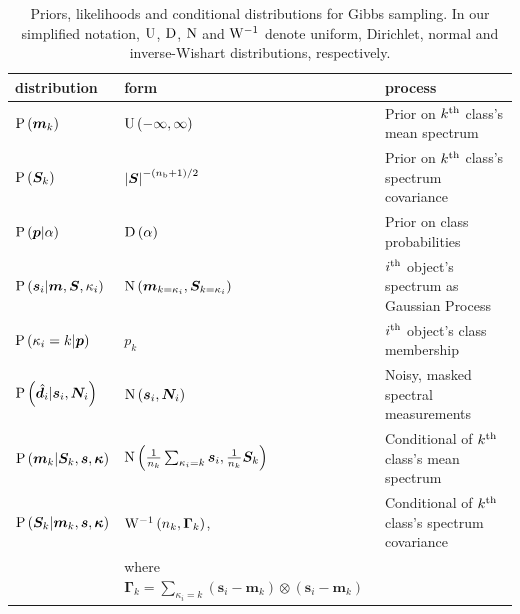 \documentclass[a4paper,fleqn,usenatbib]{mnras}
\newcommand{\nb}{n_{\rm b}}
\newcommand{\prob}{{\rm P}}
\newcommand{\normal}{{\rm{N}}}
\newcommand{\uniform}{{\rm U}}
\newcommand{\dirichlet}{{\rm D}}
\newcommand{\invwish}{{\rm W}^{-1}}
\newcommand{\specmean}{{\bm m}}
\newcommand{\speccov}{{\bm S}}
\newcommand{\classprob}{{p}}
\newcommand{\classprobs}{{\bm p}}
\newcommand{\objspec}{{\bm s}}
\newcommand{\objclass}{{\kappa}}
\newcommand{\objclasses}{{\bm \kappa}}
\newcommand{\objdata}{\hat{\bm d}}
\newcommand{\objnoise}{{\bm N}}
\newcommand{\scalemat}{{\bm \Gamma}}
\begin{document}
\begin{table}
    \centering
    \caption{Priors, likelihoods and conditional distributions for Gibbs sampling. In our simplified notation, $\uniform$, $\dirichlet$, $\normal$ and $\invwish$ denote uniform, Dirichlet, normal and inverse-Wishart distributions, respectively.}
    \label{tab:prob_dists}
    \begin{tabular}{lll}
        \hline
        distribution & form & process \\
        \hline
        $\prob\left(\specmean_k\right)$ & $\uniform\left(-\infty,\infty\right)$ & Prior on $k^{\rm th}$ class's mean spectrum \\
        $\prob\left(\speccov_k\right)$ & $\left| \speccov \right|^{-\left(\nb+1\right)/2}$ & Prior on $k^{\rm th}$ class's spectrum covariance \\
        $\prob\left(\classprobs|\alpha\right)$ & $\dirichlet\left(\alpha\right)$ & Prior on class probabilities \\
        $\prob\left(\objspec_i|\specmean,\speccov,\objclass_i\right)$ & $\normal\left(\specmean_{k=\objclass_i},\speccov_{k=\objclass_i}\right)$ & $i^{\rm th}$ object's spectrum as Gaussian Process \\
        $\prob\left(\objclass_i = k|\classprobs\right)$ & $\classprob_k$ & $i^{\rm th}$ object's class membership \\
        $\prob\left(\objdata_i|\objspec_i,\objnoise_i\right)$ & $\normal\left(\objspec_i,\objnoise_i\right)$ & Noisy, masked spectral measurements \\
        \hline
        $\prob\left(\specmean_k | \speccov_k, \objspec, \objclasses \right)$ & $\normal \left( \frac{1}{n_k} \sum_{\objclass_i = k} \objspec_i, \frac{1}{n_k} \speccov_k \right)$ & Conditional of $k^{\rm th}$ class's mean spectrum \\
        $\prob\left(\speccov_k | \specmean_k, \objspec, \objclasses \right)$ & $\invwish \left(n_k, \scalemat_k \right)$, & Conditional of $k^{\rm th}$ class's spectrum covariance \\
         & where  $\scalemat_k = \sum_{\objclass_i = k} \left( \objspec_i - \specmean_k \right) \otimes \left( \objspec_i - \specmean_k \right)$ & \\

\end{tabular}
\end{table}
\end{document}
